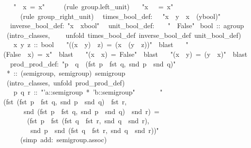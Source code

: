 \begin{isabelle}
~~~{"}{\isasymunit}~{\isasymOtimes}~x~=~x{"}\isanewline
~~~~~(rule~group.left\_unit)\isanewline
~~~{"}x~{\isasymOtimes}~{\isasymunit}~=~x{"}\isanewline
~~~~~(rule~group\_right\_unit)\isanewline
{}\isanewline
\isanewline
\isanewline
\isanewline
{}\isanewline
~~times\_bool\_def:~~~{"}x~{\isasymOtimes}~y~{\isasymequiv}~x~{\isasymnoteq}~(y{\isasymColon}bool){"}\isanewline
~~inverse\_bool\_def:~{"}x{\isasyminv}~{\isasymequiv}~x{\isasymColon}bool{"}\isanewline
~~unit\_bool\_def:~~~~{"}{\isasymunit}~{\isasymequiv}~False{"}\isanewline
\isanewline
{}~bool~::~agroup\isanewline
{}~(intro\_classes,\isanewline
~~~~unfold~times\_bool\_def~inverse\_bool\_def~unit\_bool\_def)\isanewline
~~~x~y~z~::~bool\isanewline
~~~{"}((x~{\isasymnoteq}~y)~{\isasymnoteq}~z)~=~(x~{\isasymnoteq}~(y~{\isasymnoteq}~z)){"}~~blast\isanewline
~~~{"}(False~{\isasymnoteq}~x)~=~x{"}~~blast\isanewline
~~~{"}(x~{\isasymnoteq}~x)~=~False{"}~~blast\isanewline
~~~{"}(x~{\isasymnoteq}~y)~=~(y~{\isasymnoteq}~x){"}~~blast\isanewline
{}\isanewline
\isanewline
\isanewline
{}\isanewline
~~prod\_prod\_def:~{"}p~{\isasymOtimes}~q~{\isasymequiv}~(fst~p~{\isasymOtimes}~fst~q,~snd~p~{\isasymOtimes}~snd~q){"}\isanewline
\isanewline
{}~*~::~(semigroup,~semigroup)~semigroup\isanewline
{}~(intro\_classes,~unfold~prod\_prod\_def)\isanewline
~~~p~q~r~::~{"}'a::semigroup~*~'b::semigroup{"}\isanewline
~~\isanewline
~~~~{"}(fst~(fst~p~{\isasymOtimes}~fst~q,~snd~p~{\isasymOtimes}~snd~q)~{\isasymOtimes}~fst~r,\isanewline
~~~~~~snd~(fst~p~{\isasymOtimes}~fst~q,~snd~p~{\isasymOtimes}~snd~q)~{\isasymOtimes}~snd~r)~=\isanewline
~~~~~~~(fst~p~{\isasymOtimes}~fst~(fst~q~{\isasymOtimes}~fst~r,~snd~q~{\isasymOtimes}~snd~r),\isanewline
~~~~~~~~snd~p~{\isasymOtimes}~snd~(fst~q~{\isasymOtimes}~fst~r,~snd~q~{\isasymOtimes}~snd~r)){"}\isanewline
~~~~~(simp~add:~semigroup.assoc)\isanewline
{}\isanewline
\isanewline
{}\end{isabelle}%
